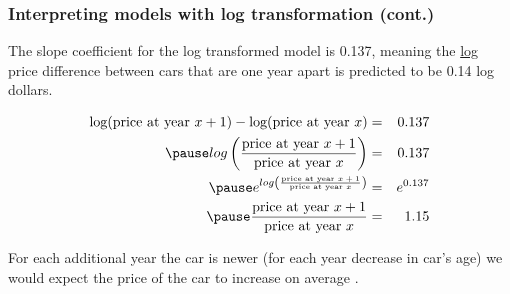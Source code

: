 \documentclass[slidestop,compress,mathserif,12pt,t,professionalfonts,xcolor=table]{beamer}
\begin{document}
\begin{frame}
\frametitle{Interpreting models with log transformation (cont.)}

The slope coefficient for the log transformed model is 0.137, meaning the \underline{log} price difference between cars that are one year apart is predicted to be 0.14 log dollars.

\begin{eqnarray*}
\text{log(price at year $x + 1$)} - \text{log(price at year $x$)} &=& 0.137 \\
\pause
log \pr{ \frac{\text{price at year $x + 1$}}{\text{price at year $x$}} } &=& 0.137 \\
\pause
e^{log \pr{ \frac{\text{price at year $x + 1$}}{\text{price at year $x$}} }} &=& e^{0.137} \\
\pause
\frac{\text{price at year $x + 1$}}{\text{price at year $x$}} &=& 1.15
\end{eqnarray*}

\pause

For each additional year the car is newer (for each year decrease in car's age) we would expect the price of the car to increase on average .

\end{frame}

\end{document}
